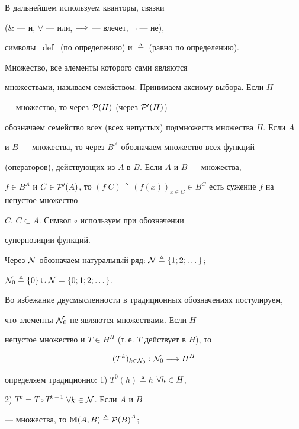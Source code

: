 В дальнейшем используем кванторы, связки


($\&$ --- и, $\vee$ --- или, $\Longrightarrow$ --- влечет, $\neg$ --- не),


символы \ def \ (по определению) и $\triangleq$ (равно по определению).


Множество, все элементы которого сами являются


множествами, называем семейством. Принимаем аксиому выбора. Если $H$


--- множество, то через ${\cal P}(H)$ (через ${\cal P}'(H)$)


обозначаем семейство всех (всех непустых) подмножеств множества $H$. Если $A$


и $B$ --- множества, то через $B^A$ обозначаем множество всех функций


(операторов), действующих из $A$ в $B$. Если $A$ и $B$ --- множества,


$f \in {B^A}$ и $C \in {{\cal P}'(A)}$, то $(f \vert C) \triangleq


(f(x))_{x \in C} \in B^C$ есть сужение $f$ на непустое множество


$C$, $C \subset A$. Символ $\circ$ используем при обозначении


суперпозиции функций.





Через ${\cal N}$ обозначаем натуральный ряд: ${\cal N} \triangleq


\{1;2;\dotsc\}$;


${\cal N}_0 \triangleq \{0\} \cup {\cal N} = \{0;1;2;\dotsc\}$.


Во избежание двусмысленности в традиционных обозначениях постулируем,


что элементы ${\cal N}_0$ не являются множествами. Если $H$ ---


непустое множество и $T \in H^H$ (т.\,е. $T$ действует в $H$), то


\begin{equation}\label{2.1}


(T^k)_{k \in {\cal{N}}_0}:{{\cal{N}}_0} \lo {H^H}


\end{equation}


определяем традиционно: 1) ${T^0}(h) \triangleq h$ \; $\forall{h} \in H$,


2) ${T^k}=T\circ{T^{k-1}}$ \; $\forall{k} \in {\cal N}$. Если $A$ и $B$


--- множества, то $\Bbb{M}(A,B) \triangleq {{\cal P}(B)}^A$;


